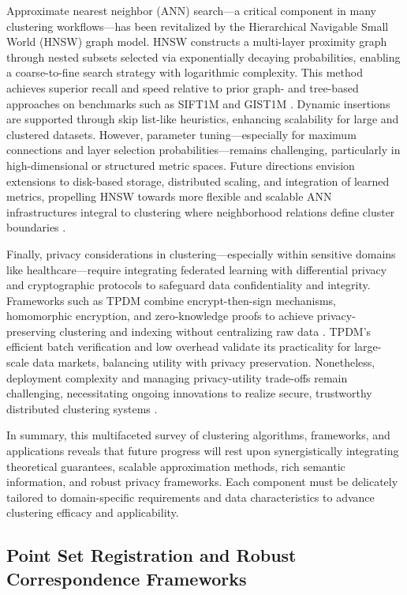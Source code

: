 \documentclass[sigconf]{acmart}
\begin{document}
Approximate nearest neighbor (ANN) search—a critical component in many clustering workflows—has been revitalized by the Hierarchical Navigable Small World (HNSW) graph model. HNSW constructs a multi-layer proximity graph through nested subsets selected via exponentially decaying probabilities, enabling a coarse-to-fine search strategy with logarithmic complexity. This method achieves superior recall and speed relative to prior graph- and tree-based approaches on benchmarks such as SIFT1M and GIST1M \cite{ref4}. Dynamic insertions are supported through skip list-like heuristics, enhancing scalability for large and clustered datasets. However, parameter tuning—especially for maximum connections and layer selection probabilities—remains challenging, particularly in high-dimensional or structured metric spaces. Future directions envision extensions to disk-based storage, distributed scaling, and integration of learned metrics, propelling HNSW towards more flexible and scalable ANN infrastructures integral to clustering where neighborhood relations define cluster boundaries \cite{ref4}.

Finally, privacy considerations in clustering—especially within sensitive domains like healthcare—require integrating federated learning with differential privacy and cryptographic protocols to safeguard data confidentiality and integrity. Frameworks such as TPDM combine encrypt-then-sign mechanisms, homomorphic encryption, and zero-knowledge proofs to achieve privacy-preserving clustering and indexing without centralizing raw data \cite{ref22,ref25}. TPDM’s efficient batch verification and low overhead validate its practicality for large-scale data markets, balancing utility with privacy preservation. Nonetheless, deployment complexity and managing privacy-utility trade-offs remain challenging, necessitating ongoing innovations to realize secure, trustworthy distributed clustering systems \cite{ref22,ref25}.

In summary, this multifaceted survey of clustering algorithms, frameworks, and applications reveals that future progress will rest upon synergistically integrating theoretical guarantees, scalable approximation methods, rich semantic information, and robust privacy frameworks. Each component must be delicately tailored to domain-specific requirements and data characteristics to advance clustering efficacy and applicability.

\subsection{Point Set Registration and Robust Correspondence Frameworks}
\end{document}
